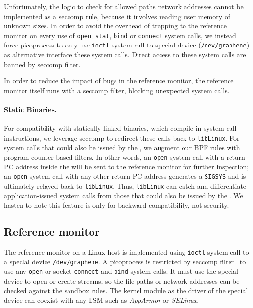 
Unfortunately, the logic to check for allowed paths network addresses cannot be implemented 
as a seccomp rule, because it involves reading user memory of unknown sizes. 
In order to avoid the overhead of trapping to the reference monitor on 
every use of {\tt open}, {\tt stat}, {\tt bind} or {\tt connect} system calls, we instead 
force picoprocess to only use {\tt ioctl} system call to \graphene{} special device ({\tt /dev/graphene}) as alternative interface these system calls. Direct access to these system calls are banned by seccomp filter.

In order to reduce the impact of bugs in the reference monitor,
the reference monitor itself runs with a seccomp filter,
blocking unexpected system calls.

\paragraph{Static Binaries.} 
For compatibility with statically linked binaries, which 
compile in system call instructions,
we leverage seccomp to redirect these calls 
back to {\tt libLinux}.  
For system calls that could also be issued by the \pal{},
we augment our BPF rules with program counter-based filters.
In other words, an {\tt open} system call with a return PC address inside the \pal{} 
will be sent to the reference monitor for further inspection;
an {\tt open} system call with any other return PC address generates 
a {\tt SIGSYS} and is ultimately relayed back to {\tt libLinux}.
Thus, {\tt libLinux} can catch and differentiate application-issued system calls
from those that could also be issued by the \pal{}.
We hasten to note this feature is only for backward compatibility,
not security.


\subsection{Reference monitor}
\label{sec:linux:security:ref-monitor}

The \graphene{} reference monitor on a Linux host
is implemented using {\tt ioctl} system call to a special device {\tt /dev/graphene}.
A picoprocess is restricted by seccomp filter~\cite{seccomp} to use any {\tt open} or socket {\tt connect} and {\tt bind} system calls.
It must use the \graphene{} special device to open or create streams,
so the file paths or network addresses can be checked against the sandbox rules.
The kernel module as the driver of the \graphene{} special device can coexist with any LSM such as \emph{AppArmor} or \emph{SELinux}.


